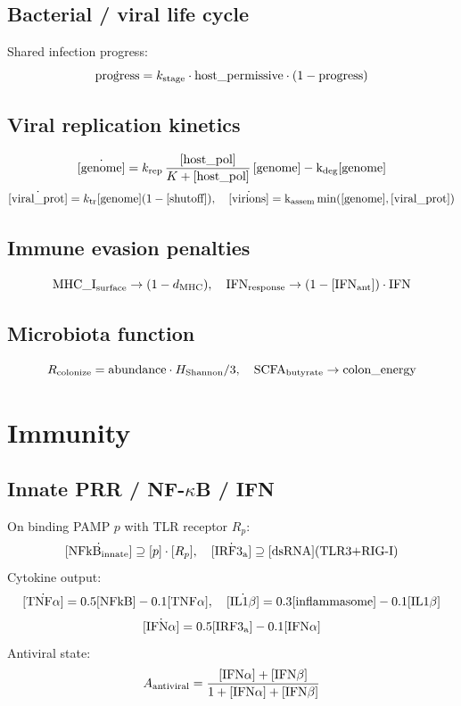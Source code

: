 \documentclass[11pt,a4paper]{article}
\newcommand{\eq}[1]{\begin{equation}#1\end{equation}}
\begin{document}
\subsection{Bacterial / viral life cycle}
Shared infection progress:
\eq{ \dot{\mathrm{progress}} = k_{\rm stage}\cdot\mathrm{host\_permissive}\cdot(1-\mathrm{progress}) }

\subsection{Viral replication kinetics}
\eq{ \dot{[\rm genome]} = k_{\rm rep}\,\frac{[\rm host\_pol]}{K+[\rm host\_pol]}\,[\rm genome] - k_{\rm deg}[\rm genome] }
\eq{ \dot{[\rm viral\_prot]} = k_{\rm tr}[\rm genome](1-[\rm shutoff]),\quad \dot{[\rm virions]}=k_{\rm assem}\min([\rm genome],[\rm viral\_prot]) }

\subsection{Immune evasion penalties}
\eq{ \mathrm{MHC\_I}_{\rm surface}\to(1-d_{\rm MHC}),\quad \mathrm{IFN}_{\rm response}\to (1-[\rm IFN_{\rm ant}])\cdot\mathrm{IFN} }

\subsection{Microbiota function}
\eq{ R_{\rm colonize}=\mathrm{abundance}\cdot H_{\rm Shannon}/3,\quad \mathrm{SCFA}_{\rm butyrate}\to\mathrm{colon\_energy} }

\clearpage
\section{Immunity}
\label{sec:immune}

\subsection{Innate PRR / NF-$\kappa$B / IFN}
On binding PAMP $p$ with TLR receptor $R_p$:
\eq{ \dot{[\rm NFkB_{\rm innate}]}\supseteq [p]\cdot[R_p],\quad \dot{[\rm IRF3_a]}\supseteq[\rm dsRNA](\text{TLR3+RIG-I}) }
Cytokine output:
\eq{ \dot{[\rm TNF\alpha]}=0.5[\rm NFkB]-0.1[\rm TNF\alpha],\quad \dot{[\rm IL1\beta]}=0.3[\rm inflammasome]-0.1[\rm IL1\beta] }
\eq{ \dot{[\rm IFN\alpha]}=0.5[\rm IRF3_a]-0.1[\rm IFN\alpha] }
Antiviral state:
\eq{ A_{\rm antiviral}=\frac{[\rm IFN\alpha]+[\rm IFN\beta]}{1+[\rm IFN\alpha]+[\rm IFN\beta]} }
\end{document}
